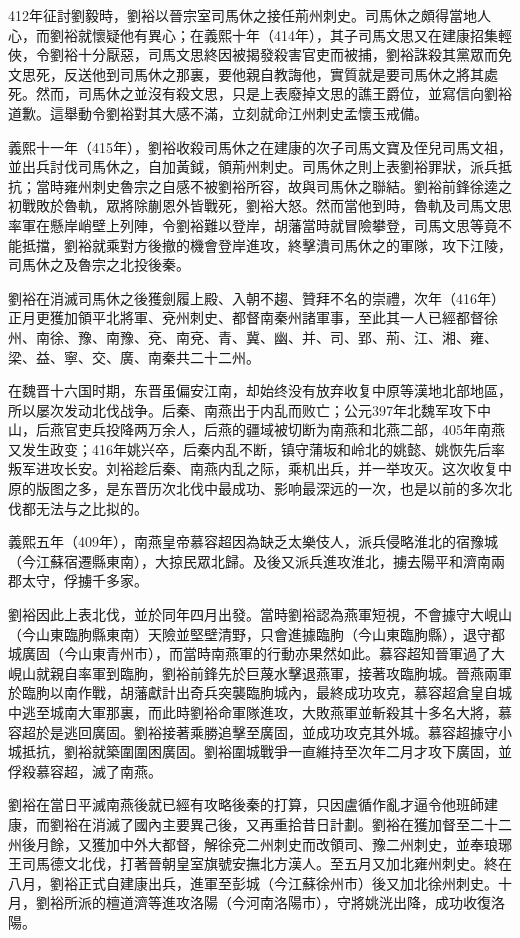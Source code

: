 412年征討劉毅時，劉裕以晉宗室司馬休之接任荊州刺史。司馬休之頗得當地人心，而劉裕就懷疑他有異心；在義熙十年（414年），其子司馬文思又在建康招集輕俠，令劉裕十分厭惡，司馬文思終因被揭發殺害官吏而被捕，劉裕誅殺其黨眾而免文思死，反送他到司馬休之那裏，要他親自教誨他，實質就是要司馬休之將其處死。然而，司馬休之並沒有殺文思，只是上表廢掉文思的譙王爵位，並寫信向劉裕道歉。這舉動令劉裕對其大感不滿，立刻就命江州刺史孟懷玉戒備。

義熙十一年（415年），劉裕收殺司馬休之在建康的次子司馬文寶及侄兒司馬文祖，並出兵討伐司馬休之，自加黃鉞，領荊州刺史。司馬休之則上表劉裕罪狀，派兵抵抗；當時雍州刺史魯宗之自感不被劉裕所容，故與司馬休之聯結。劉裕前鋒徐逵之初戰敗於魯軌，眾將除蒯恩外皆戰死，劉裕大怒。然而當他到時，魯軌及司馬文思率軍在懸岸峭壁上列陣，令劉裕難以登岸，胡藩當時就冒險攀登，司馬文思等竟不能抵擋，劉裕就乘對方後撤的機會登岸進攻，終擊潰司馬休之的軍隊，攻下江陵，司馬休之及魯宗之北投後秦。

劉裕在消滅司馬休之後獲劍履上殿、入朝不趨、贊拜不名的崇禮，次年（416年）正月更獲加領平北將軍、兗州刺史、都督南秦州諸軍事，至此其一人已經都督徐州、南徐、豫、南豫、兗、南兗、青、冀、幽、并、司、郢、荊、江、湘、雍、梁、益、寧、交、廣、南秦共二十二州。

在魏晋十六国时期，东晋虽偏安江南，却始终没有放弃收复中原等漢地北部地區，所以屡次发动北伐战争。后秦、南燕出于内乱而败亡；公元397年北魏军攻下中山，后燕官吏兵投降两万余人，后燕的疆域被切断为南燕和北燕二部，405年南燕又发生政变；416年姚兴卒，后秦内乱不断，镇守蒲坂和岭北的姚懿、姚恢先后率叛军进攻长安。刘裕趁后秦、南燕内乱之际，乘机出兵，并一举攻灭。这次收复中原的版图之多，是东晋历次北伐中最成功、影响最深远的一次，也是以前的多次北伐都无法与之比拟的。

義熙五年（409年），南燕皇帝慕容超因為缺乏太樂伎人，派兵侵略淮北的宿豫城（今江蘇宿遷縣東南），大掠民眾北歸。及後又派兵進攻淮北，擄去陽平和濟南兩郡太守，俘擄千多家。

劉裕因此上表北伐，並於同年四月出發。當時劉裕認為燕軍短視，不會據守大峴山（今山東臨朐縣東南）天險並堅壁清野，只會進據臨朐（今山東臨朐縣），退守都城廣固（今山東青州市），而當時南燕軍的行動亦果然如此。慕容超知晉軍過了大峴山就親自率軍到臨朐，劉裕前鋒先於巨蔑水擊退燕軍，接著攻臨朐城。晉燕兩軍於臨朐以南作戰，胡藩獻計出奇兵突襲臨朐城內，最終成功攻克，慕容超倉皇自城中逃至城南大軍那裏，而此時劉裕命軍隊進攻，大敗燕軍並斬殺其十多名大將，慕容超於是逃回廣固。劉裕接著乘勝追擊至廣固，並成功攻克其外城。慕容超據守小城抵抗，劉裕就築圍圍困廣固。劉裕圍城戰爭一直維持至次年二月才攻下廣固，並俘殺慕容超，滅了南燕。

劉裕在當日平滅南燕後就已經有攻略後秦的打算，只因盧循作亂才逼令他班師建康，而劉裕在消滅了國內主要異己後，又再重拾昔日計劃。劉裕在獲加督至二十二州後月餘，又獲加中外大都督，解徐兗二州刺史而改領司、豫二州刺史，並奉琅琊王司馬德文北伐，打著晉朝皇室旗號安撫北方漢人。至五月又加北雍州刺史。終在八月，劉裕正式自建康出兵，進軍至彭城（今江蘇徐州市）後又加北徐州刺史。十月，劉裕所派的檀道濟等進攻洛陽（今河南洛陽市），守將姚洸出降，成功收復洛陽。


